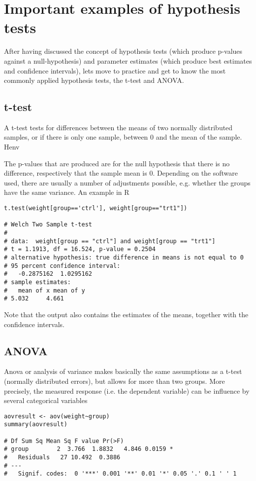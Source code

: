 \documentclass{tufte-book} %
\begin{document}
\chapter{Important examples of hypothesis tests}

After having discussed the concept of hypothesis tests (which produce p-values against a null-hypothesis) and parameter estimates (which produce best estimates and confidence intervals), lets move to practice and get to know the most commonly applied hypothesis tests, the t-test and ANOVA.

\section{t-test}

A t-test tests for differences between the means of two normally distributed samples, or if there is only one sample, between 0 and the mean of the sample. Henv


The p-values that are produced are for the null hypothesis that there is no difference, respectively that the sample mean is 0. Depending on the software used, there are usually a number of adjustments possible, e.g. whether the groups have the same variance. An example in R

\begin{lstlisting}
t.test(weight[group=='ctrl'], weight[group=="trt1"])

# Welch Two Sample t-test
# 
# data:  weight[group == "ctrl"] and weight[group == "trt1"] 
# t = 1.1913, df = 16.524, p-value = 0.2504
# alternative hypothesis: true difference in means is not equal to 0 
# 95 percent confidence interval:
#   -0.2875162  1.0295162 
# sample estimates:
#   mean of x mean of y 
# 5.032     4.661 
\end{lstlisting}

Note that the output also contains the estimates of the means, together with the confidence intervals. 

\section{ANOVA}

Anova or analysis of variance makes basically the same assumptions as a t-test (normally distributed errors), but allows for more than two groups. More precisely, the measured response (i.e. the dependent variable) can be influence by several categorical variables  

\begin{lstlisting}
aovresult <- aov(weight~group)
summary(aovresult)

# Df Sum Sq Mean Sq F value Pr(>F)  
# group        2  3.766  1.8832   4.846 0.0159 *
#   Residuals   27 10.492  0.3886                 
# ---
#   Signif. codes:  0 '***' 0.001 '**' 0.01 '*' 0.05 '.' 0.1 ' ' 1
\end{lstlisting}
\end{document}
